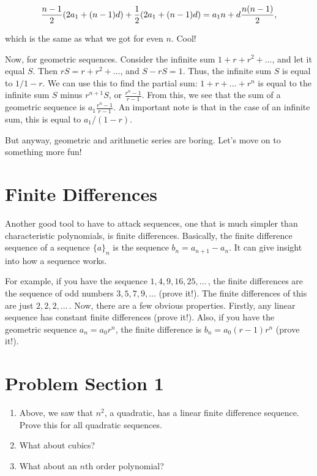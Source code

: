 \documentclass[12pt,letterpaper]{article}
\begin{document}
$$\frac{n-1}{2}(2a_1 + (n-1)d) + \frac{1}{2}(2a_1 + (n-1)d) \\
= a_1 n + d \frac{n (n-1)}{2},$$

which is the same as what we got for even $n$. Cool!

Now, for geometric sequences.
Consider the infinite sum $1 + r + r^2 + \dots$, and let it equal $S$. Then
$rS = r + r^2 + \dots$, and $S - rS = 1$. Thus, the infinite sum $S$ is equal to
$1/1-r$. We can use this to find the partial sum: $1 + r + \dots + r^n$ is equal
to the infinite sum $S$ minus $r^{n+1}S$, or $\frac{r^n - 1}{r - 1}$. From this,
we see that the sum of a geometric sequence is $a_1 \frac{r^n - 1}{r - 1}$.
An important note is that in the case of an infinite sum, this is equal to
$a_1/(1 - r)$.

But anyway, geometric and arithmetic series are boring. Let's move on to
something more fun!

\section{Finite Differences}
Another good tool to have to attack sequences, one that is much
simpler than characteristic polynomials, is finite differences.
Basically, the finite difference sequence of a sequence $\{a\}_n$ is the
sequence $b_n = a_{n+1} - a_n$. It can give insight into how a
sequence works.

For example, if you have the sequence $1, 4, 9, 16, 25, \ldots\,$, the
finite differences are the sequence of odd numbers $3, 5, 7, 9, \ldots$ (prove it!).
The finite differences of this are just $2, 2, 2, \ldots\,$. Now, there are
a few obvious properties. Firstly, any linear sequence has
constant finite differences (prove it!). Also, if you have the
geometric sequence $a_n = a_0 r^n$, the finite difference is
$b_n = a_0 (r-1) r^n$ (prove it!).

\section{Problem Section 1}
\begin{enumerate}
\item Above, we saw that $n^2$, a quadratic, has a linear finite difference
sequence. Prove this for all quadratic sequences.
\item What about cubics?
\item What about an $n$th order polynomial?
\end{enumerate}
\end{document}
